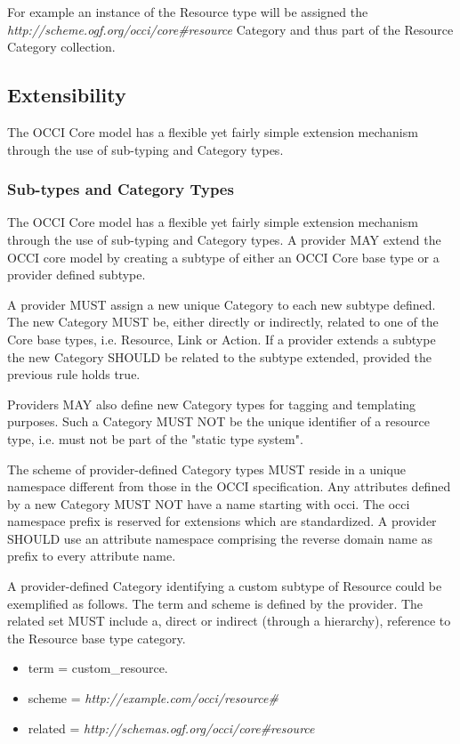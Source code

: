 \documentclass[10pt,a4paper,british]{article}
\begin{document}
For example an instance of the Resource type will be assigned the
\textit{http://scheme.ogf.org/occi/core\#resource} Category and thus
part of the Resource Category collection.

\subsection{Extensibility}
The OCCI Core model has a flexible yet fairly simple extension
mechanism through the use of sub-typing and Category types.

\subsubsection{Sub-types and Category Types}
The OCCI Core model has a flexible yet fairly simple extension
mechanism through the use of sub-typing and Category types.  A
provider MAY extend the OCCI core model by creating a subtype of
either an OCCI Core base type or a provider defined subtype.

A provider MUST assign a new unique Category to each new subtype
defined. The new Category MUST be, either directly or indirectly,
related to one of the Core base types, i.e. Resource, Link or
Action. If a provider extends a subtype the new Category SHOULD be
related to the subtype extended, provided the previous rule holds
true.

Providers MAY also define new Category types for tagging and
templating purposes. Such a Category MUST NOT be the unique identifier
of a resource type, i.e. must not be part of the "static type system".

The scheme of provider-defined Category types MUST reside in a unique
namespace different from those in the OCCI specification. Any
attributes defined by a new Category MUST NOT have a name starting
with occi. The occi namespace prefix is reserved for extensions which
are standardized. A provider SHOULD use an attribute namespace
comprising the reverse domain name as prefix to every attribute name.

A provider-defined Category identifying a custom subtype of Resource
could be exemplified as follows. The term and scheme is defined by the
provider. The related set MUST include a, direct or indirect (through
a hierarchy), reference to the Resource base type category.

\begin{itemize}
\item term = custom\_resource.
\item scheme = \textit{http://example.com/occi/resource\#}
\item related = \textit{http://schemas.ogf.org/occi/core\#resource}
\end{itemize}
\end{document}
